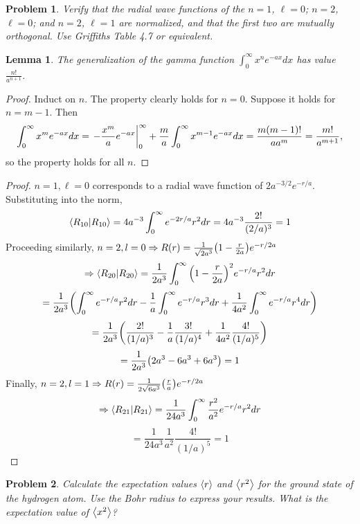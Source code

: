 \documentclass{article}
\newtheorem{prob}{Problem}
\newtheorem{lem}{Lemma}
\renewcommand*{\proofname}{Solution}
\begin{document}
\begin{prob}
  Verify that the radial wave functions of the $n = 1$, $\ell = 0$; $n = 2$, $\ell = 0$; and $n = 2$, $\ell = 1$ are normalized,
  and that the first two are mutually orthogonal. Use Griffiths Table 4.7 or equivalent.
\end{prob}

\begin{lem}
  The generalization of the gamma function $\int_{0}^{\infty}x^{n}e^{-ax}dx$ has value $\frac{n!}{a^{n+1}}$.
\end{lem}

\begin{proof}[Proof]
  Induct on $n$.
  The property clearly holds for $n = 0$.
  Suppose it holds for $n = m - 1$.
  Then
  \[
    \int_{0}^{\infty}x^{m}e^{-ax}dx = \eval{-\frac{x^{m}}{a}e^{-ax}}_{0}^{\infty} + \frac{m}{a}\int_{0}^{\infty}x^{m-1}e^{-ax}dx
    = \frac{m(m-1)!}{aa^{m}}
    = \frac{m!}{a^{m+1}},
  \]
  so the property holds for all $n$.
\end{proof}
\renewcommand*{\proofname}{Solution}
\begin{proof}
  $n = 1, \ell = 0$ corresponds to a radial wave function of $2a^{-3/2}e^{-r/a}$.
  Substituting into the norm,
  \[
    \braket{R_{10}}{R_{10}} = 4a^{-3}\int_{0}^{\infty}e^{-2r/a}r^{2}dr = 4a^{-3}\frac{2!}{(2 / a)^{3}} = 1
  \]
  Proceeding similarly, $n = 2, l = 0 \Rightarrow R(r) = \frac{1}{\sqrt{2a^{3}}}\qty(1-\frac{r}{2a})e^{-r/2a}$
  \[
    \Rightarrow \braket{R_{20}}{R_{20}} = \frac{1}{2a^{3}}\int_{0}^{\infty}\qty(1 - \frac{r}{2a})^{2}e^{-r/a}r^{2}dr
  \]
  \[
    = \frac{1}{2a^{3}}\qty(\int_{0}^{\infty}e^{-r/a}r^{2}dr - \frac{1}{a}\int_{0}^{\infty}e^{-r/a}r^{3}dr + \frac{1}{4a^{2}}\int_{0}^{\infty}e^{-r/a}r^{4}dr)
  \]
  \[
    = \frac{1}{2a^{3}}\qty(\frac{2!}{(1 / a)^{3}} - \frac{1}{a}\frac{3!}{(1 / a)^{4}} + \frac{1}{4a^{2}}\frac{4!}{(1 / a)^{5}})
  \]
  \[
    = \frac{1}{2a^{3}}\qty(2a^{3} - 6a^{3} + 6a^{3}) = 1
  \]
  Finally, $n=2, l = 1\Rightarrow R(r) = \frac{1}{2\sqrt{6a^{3}}}\qty(\frac{r}{a})e^{-r/2a}$
  \[
    \Rightarrow \braket{R_{21}}{R_{21}} = \frac{1}{24a^{3}}\int_{0}^{\infty}\frac{r^{2}}{a^{2}}e^{-r/a}r^{2}dr
  \]
  \[
    = \frac{1}{24a^{3}}\frac{1}{a^{2}}\frac{4!}{(1 / a)^{5}} = 1
  \]
\end{proof}

\begin{prob}
  Calculate the expectation values $\expval{r}$ and $\expval{r^{2}}$ for the ground state of the hydrogen atom.
  Use the Bohr radius to express your results.
  What is the expectation value of $\expval{x^{2}}$?
\end{prob}
\end{document}
